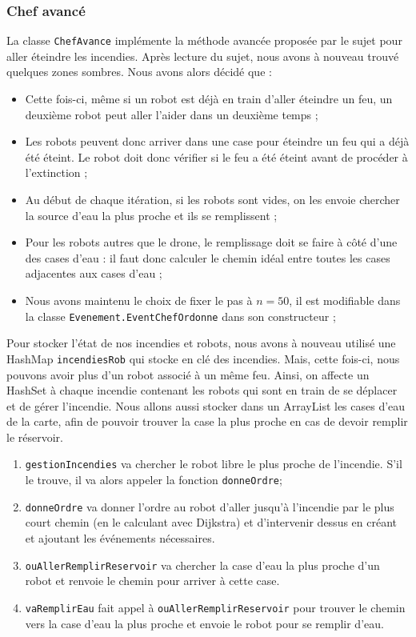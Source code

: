 \documentclass[a4paper,8pt]{article} %
\begin{document}
\subsubsection{Chef avancé}
La classe \texttt{ChefAvance} implémente la méthode avancée proposée par le sujet pour aller éteindre les incendies. Après lecture du sujet, nous avons à nouveau trouvé quelques zones sombres. Nous avons alors décidé que :
\begin{itemize}
    \item Cette fois-ci, même si un robot est déjà en train d'aller éteindre un feu, un deuxième robot peut aller l'aider dans un deuxième temps ;
    \item Les robots peuvent donc arriver dans une case pour éteindre un feu qui a déjà été éteint. Le robot doit donc vérifier si le feu a été éteint avant de procéder à l'extinction ;
    \item Au début de chaque itération, si les robots sont vides, on les envoie chercher la source d'eau la plus proche et ils se remplissent ;
    \item Pour les robots autres que le drone, le remplissage doit se faire à côté d'une des cases d'eau : il faut donc calculer le chemin idéal entre toutes les cases adjacentes aux cases d'eau ;
    \item Nous avons maintenu le choix de fixer le pas à $n=50$, il est modifiable dans la classe \texttt{Evenement.EventChefOrdonne} 
    dans son constructeur ;
\end{itemize}

Pour stocker l'état de nos incendies et robots, nous avons à nouveau utilisé une HashMap \texttt{incendiesRob} qui stocke en clé des incendies. Mais, cette fois-ci, nous pouvons avoir plus d'un robot associé à un même feu. Ainsi, on affecte un HashSet à chaque incendie contenant les robots qui sont en train de se déplacer et de gérer l'incendie.
Nous allons aussi stocker dans un ArrayList les cases d'eau de la carte, afin de pouvoir trouver la case la plus proche en cas de devoir remplir le réservoir.

\begin{enumerate}
    \item \texttt{gestionIncendies} va chercher le robot libre le plus proche de l'incendie. S'il le trouve, il va alors appeler la fonction \texttt{donneOrdre};
    \item \texttt{donneOrdre} va donner l'ordre au robot d'aller jusqu'à l'incendie par le plus court chemin (en le calculant avec Dijkstra)
    et d'intervenir dessus en créant et ajoutant les événements nécessaires.
    \item \texttt{ouAllerRemplirReservoir} va chercher la case d'eau la plus proche d'un robot et renvoie le chemin pour arriver à cette case.
    \item \texttt{vaRemplirEau} fait appel à \texttt{ouAllerRemplirReservoir} pour trouver le chemin vers la case d'eau la plus proche et envoie le robot pour se remplir d'eau.
\end{enumerate}
\end{document}
